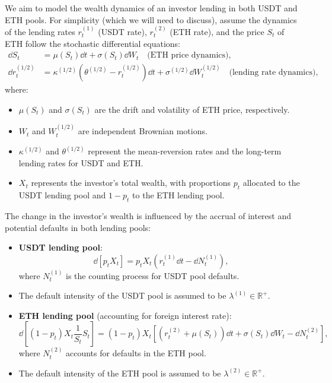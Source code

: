 \documentclass{article} %
\theoremstyle{plain}
\theoremstyle{definition} %
\begin{document}
We aim to model the wealth dynamics of an investor lending in both USDT and ETH pools. For simplicity (which we will need to discuss), 
assume the dynamics of the lending rates $r^{(1)}_t$ (USDT rate), $r^{(2)}_t$ (ETH rate), and the price $S_t$ of ETH follow the stochastic differential equations:
\begin{align*}
  \dd S_t &= \mu(S_t) \dd t + \sigma(S_t) \dd W_t \quad \text{(ETH price dynamics)}, \\
  \dd r^{(1/2)}_t &= \kappa^{(1/2)} \left(\theta^{(1/2)} - r_t^{(1/2)}\right) \dd t + \sigma^{(1/2)} \dd W^{(1/2)}_t \quad \text{(lending rate dynamics)},
\end{align*}
where:
\begin{itemize}
    \item $\mu(S_t)$ and $\sigma(S_t)$ are the drift and volatility of ETH price, respectively.
    \item $W_t$ and $W^{(1/2)}_t$ are independent Brownian motions.
    \item $\kappa^{(1/2)}$ and $\theta^{(1/2)}$ represent the mean-reversion rates and the long-term lending rates for USDT and ETH.
    \item $X_t$ represents the investor's total wealth, with proportions $p_t$ allocated to the USDT lending pool and $1 - p_t$ to the ETH lending pool.
\end{itemize}

The change in the investor’s wealth is influenced by the accrual of interest and potential defaults in both lending pools:

\begin{itemize}
    \item \textbf{USDT lending pool}:
    \[
    \dd \left[p_t X_t\right] = p_t X_t \left(r^{(1)}_t \dd t - \dd N^{(1)}_t \right),
    \]
    where $N^{(1)}_t$ is the counting process for USDT pool defaults.

    \item The default intensity of the USDT pool is assumed to be $\lambda^{(1)}\in \mathbb{R}^+$.

    \item \textbf{ETH lending pool} (accounting for foreign interest rate):
    \[
    \dd \left[(1-p_t)X_t \frac{1}{S_{t}} S_t\right] = (1-p_t) X_t \left[(r^{(2)}_t + \mu(S_t)) \dd t + \sigma(S_t) \dd W_t - \dd N^{(2)}_t \right],
    \]
    where $N^{(2)}_t$ accounts for defaults in the ETH pool.

    \item The default intensity of the ETH pool is assumed to be $\lambda^{(2)}\in \mathbb{R}^+$.
\end{itemize}
\end{document}
